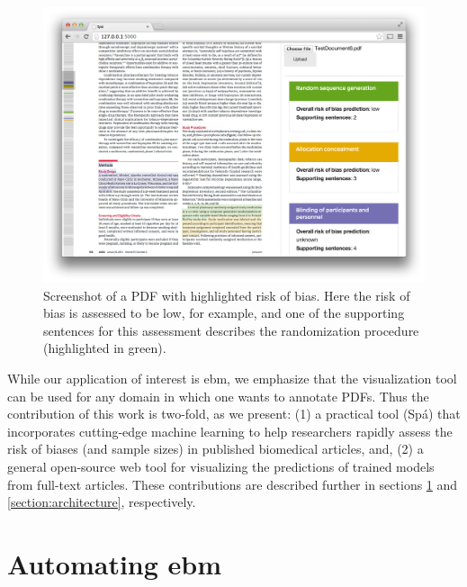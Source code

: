 \documentclass[runningheads,a4paper]{llncs}
\begin{document}
\begin{figure}[htb]
	\vspace{-2em}
\centering
\includegraphics[width=.8\linewidth]{./images/screenshot2.png}
\vspace{-1em}
\caption{\label{fig:screenshot}Screenshot of a PDF with highlighted risk of bias. Here the risk of bias is assessed to be low, for example, and one of the supporting sentences for this assessment describes the randomization procedure (highlighted in green).}
\vspace{-2em}
\end{figure}

While our application of interest is \ac{ebm}, we emphasize that the visualization tool can be used for any domain in which one wants to annotate PDFs. 
Thus the contribution of this work is two-fold, as we present:
(1) a practical tool (Spá) that incorporates cutting-edge machine learning to help researchers rapidly assess the risk of biases (and sample sizes) in published biomedical articles, and,
(2) a general open-source web tool for visualizing the predictions of trained models from full-text articles.
These contributions are described further in sections \ref{section:EBM-ML} and \ref{section:architecture}, respectively.


\section{Automating \acl{ebm}}
\label{section:EBM-ML}
\end{document}
